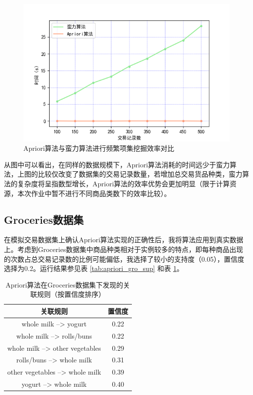 \documentclass[12pt,a4paper]{article}
\theoremstyle{definition}
\begin{document}
\begin{figure}[H]
	\centering
	\includegraphics[width=0.7\linewidth]{img/time_kline.png}
	\caption{Apriori算法与蛮力算法进行频繁项集挖掘效率对比}
	\label{fig:time_com}
\end{figure}

从图中可以看出，在同样的数据规模下，Apriori算法消耗的时间远少于蛮力算法，上图的比较仅改变了数据集的交易记录数量，若增加总交易货品种类，蛮力算法的复杂度将呈指数型增长，Apriori算法的效率优势会更加明显（限于计算资源，本次作业中暂不进行不同商品类数下的效率比较）。

\vspace{0.01\linewidth}
\subsection{Groceries数据集}

\vspace{0.01\linewidth}
在模拟交易数据集上确认Apriori算法实现的正确性后，我将算法应用到真实数据上。考虑到Groceries数据集中商品种类相对于实例较多的特点，即每种商品出现的次数占总交易记录数的比例可能偏低，我选择了较小的支持度（0.05），置信度选择为0.2。运行结果参见表 \ref{tab:apriori_gro_sup} 和表 \ref{tab:apriori_gro_con}。

\vspace{0.01\linewidth}
\begin{table}[H]
	\renewcommand\arraystretch{1.35}
	\caption{Apriori算法在Groceries数据集下发现的关联规则（按置信度排序）}
	\label{tab:apriori_gro_con}
	\centering
	
	\begin{tabular}{c|c}
		\centering
		关联规则 & 置信度 \\
		\hline
		whole milk --> yogurt & 0.22 \\
		whole milk --> rolls/buns & 0.22 \\
		whole milk --> other vegetables & 0.29 \\
		rolls/buns --> whole milk & 0.31 \\
		other vegetables --> whole milk & 0.39 \\
		yogurt --> whole milk & 0.40 \\
	\end{tabular}
\end{table}
\end{document}
